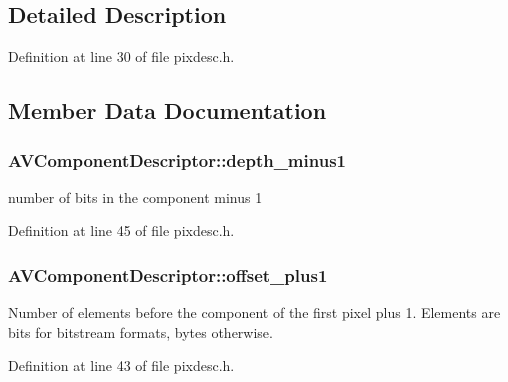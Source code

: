\subsection{Detailed Description}


Definition at line 30 of file pixdesc.\+h.



\subsection{Member Data Documentation}
\subsubsection[{\texorpdfstring{depth\+\_\+minus1}{depth_minus1}}]{ A\+V\+Component\+Descriptor\+::depth\+\_\+minus1}\hypertarget{struct_a_v_component_descriptor_adfa5d36597fa267a289df19f5b342810}{}\label{struct_a_v_component_descriptor_adfa5d36597fa267a289df19f5b342810}


number of bits in the component minus 1 



Definition at line 45 of file pixdesc.\+h.

\subsubsection[{\texorpdfstring{offset\+\_\+plus1}{offset_plus1}}]{ A\+V\+Component\+Descriptor\+::offset\+\_\+plus1}\hypertarget{struct_a_v_component_descriptor_ad6df400869e3f23db136d4cdccd09ba9}{}\label{struct_a_v_component_descriptor_ad6df400869e3f23db136d4cdccd09ba9}
Number of elements before the component of the first pixel plus 1. Elements are bits for bitstream formats, bytes otherwise. 

Definition at line 43 of file pixdesc.\+h.

